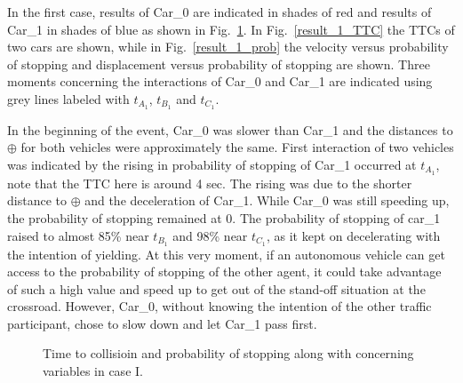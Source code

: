 \documentclass[twocolumn,10pt]{asme2e}
\begin{document}
 
 
In the first case, results of Car\_0 are indicated in shades of red and results of Car\_1 in shades of blue as shown in Fig.~\ref{result_1}. In Fig.~\ref{result_1_TTC} the TTCs of two cars are shown, while in Fig.~\ref{result_1_prob} the velocity versus probability of stopping and displacement versus probability of stopping are shown. Three moments concerning the interactions of Car\_0 and Car\_1 are indicated using grey lines labeled with $t_{A_1}$, $t_{B_1}$ and $t_{C_1}$. 

In the beginning of the event, Car\_0 was slower than Car\_1 and the distances to $\oplus$ for both vehicles were approximately the same. First interaction of two vehicles was indicated by the rising in probability of stopping of Car\_1 occurred at $t_{A_1}$, note that the TTC here is around 4 sec. The rising was due to the shorter distance to $\oplus$ and the deceleration of Car\_1. While Car\_0  was still speeding up, the probability of stopping remained at 0. The probability of stopping of car\_1 raised to almost 85\% near $t_{B_1}$ and 98\% near $t_{C_1}$, as it kept on decelerating with the intention of yielding. At this very moment, if an autonomous vehicle can get access to the probability of stopping of the other agent, it could take advantage of such a high value and speed up to get out of the stand-off situation at the crossroad. However, Car\_0, without knowing the intention of the other traffic participant, chose to slow down and let Car\_1 pass first.  


\begin{figure}[htbp!]
    \centering
    \hfill
    \hfill
    
    \caption{Time to collisioin and probability of stopping along with concerning variables in case I.} \label{result_1}
\end{figure}
\end{document}
